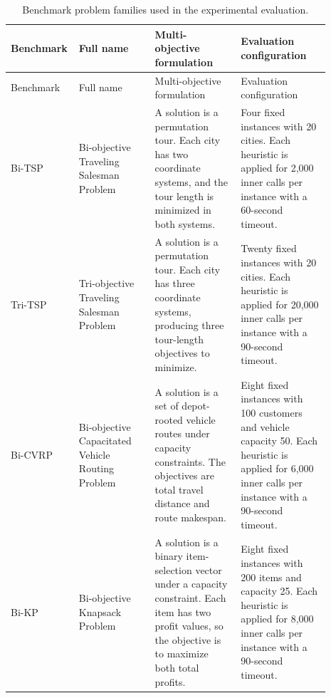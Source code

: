 \begin{longtable}{>{\raggedright\arraybackslash}p{0.13\linewidth}>{\raggedright\arraybackslash}p{0.23\linewidth}>{\raggedright\arraybackslash}p{0.26\linewidth}>{\raggedright\arraybackslash}p{0.27\linewidth}}
\caption[Benchmark problem families]{Benchmark problem families used in the experimental evaluation.}
\label{tab:benchmark-problems}\\
\toprule
Benchmark & Full name & Multi-objective formulation & Evaluation configuration \\
\midrule
\endfirsthead
\toprule
Benchmark & Full name & Multi-objective formulation & Evaluation configuration \\
\midrule
\endhead
Bi-TSP & Bi-objective Traveling Salesman Problem & A solution is a permutation tour. Each city has two coordinate systems, and the tour length is minimized in both systems. & Four fixed instances with 20 cities. Each heuristic is applied for 2,000 inner calls per instance with a 60-second timeout. \\
Tri-TSP & Tri-objective Traveling Salesman Problem & A solution is a permutation tour. Each city has three coordinate systems, producing three tour-length objectives to minimize. & Twenty fixed instances with 20 cities. Each heuristic is applied for 20,000 inner calls per instance with a 90-second timeout. \\
Bi-CVRP & Bi-objective Capacitated Vehicle Routing Problem & A solution is a set of depot-rooted vehicle routes under capacity constraints. The objectives are total travel distance and route makespan. & Eight fixed instances with 100 customers and vehicle capacity 50. Each heuristic is applied for 6,000 inner calls per instance with a 90-second timeout. \\
Bi-KP & Bi-objective Knapsack Problem & A solution is a binary item-selection vector under a capacity constraint. Each item has two profit values, so the objective is to maximize both total profits. & Eight fixed instances with 200 items and capacity 25. Each heuristic is applied for 8,000 inner calls per instance with a 90-second timeout. \\
\bottomrule
\end{longtable}
